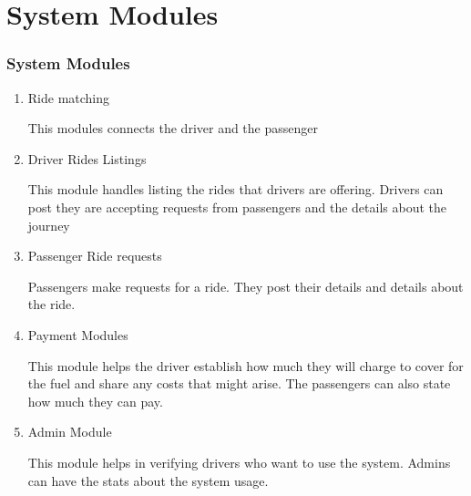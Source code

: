 \section[Modules]{System Modules}
\begin{frame}[allowframebreaks]
      \frametitle{System Modules}

      \begin{enumerate}
            \item Ride matching

                  This modules connects the driver and the passenger

            \item Driver Rides Listings

                  This module handles listing the rides that drivers are offering. Drivers can post they are accepting requests from passengers and the details about the journey

            \item Passenger Ride requests

                  Passengers make requests for a ride. They post their details and details about the ride.

            \item Payment Modules

                  This module helps the driver establish how much they will charge to cover for the fuel and share any costs that might arise. The passengers can also state how much they can pay.

            \item Admin Module

                  This module helps in verifying drivers who want to use the system. Admins can have the stats about the system usage.
      \end{enumerate}
\end{frame}